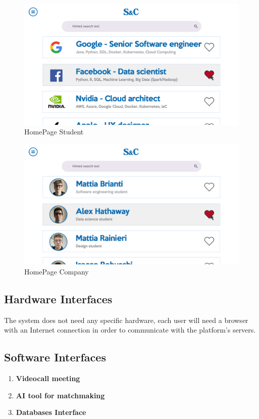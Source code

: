 \begin{figure}[H]
      \centering
      \includegraphics[width=\textwidth]{RASD/Assets/User interfaces/Homepage_student.png}
      \caption{HomePage Student}
      \label{fig:HomePage Student}
\end{figure}
\begin{figure}[H]
      \centering
      \includegraphics[width=\textwidth]{RASD/Assets/User interfaces/Homepage Company.png}
      \caption{HomePage Company}
      \label{fig:HomePage Company}
\end{figure}


\subsection{Hardware Interfaces}
The system does not need any specific hardware, each user will need a browser with an Internet connection in order to communicate with the platform's servers.

\subsection{Software Interfaces}
\begin{enumerate}
    \item \textbf{Videocall meeting}
    \item \textbf{AI tool for matchmaking}
    \item \textbf{Databases Interface}
\end{enumerate}

